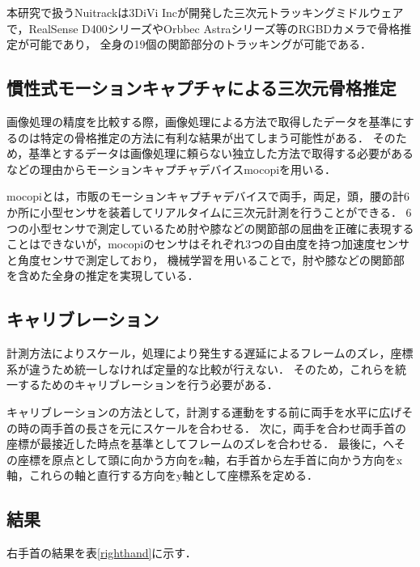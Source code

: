 \documentclass[titlepage]{jarticle}
\begin{document}
本研究で扱うNuitrackは3DiVi Incが開発した三次元トラッキングミドルウェアで，RealSense D400シリーズやOrbbec Astraシリーズ等のRGBDカメラで骨格推定が可能であり，
全身の19個の関節部分のトラッキングが可能である．
%
%
\subsection{慣性式モーションキャプチャによる三次元骨格推定}
%
画像処理の精度を比較する際，画像処理による方法で取得したデータを基準にするのは特定の骨格推定の方法に有利な結果が出てしまう可能性がある．
そのため，基準とするデータは画像処理に頼らない独立した方法で取得する必要があるなどの理由からモーションキャプチャデバイスmocopi\cite{mocopi}を用いる．

mocopiとは，市販のモーションキャプチャデバイスで両手，両足，頭，腰の計6か所に小型センサを装着してリアルタイムに三次元計測を行うことができる．
6つの小型センサで測定しているため肘や膝などの関節部の屈曲を正確に表現することはできないが，mocopiのセンサはそれぞれ3つの自由度を持つ加速度センサと角度センサで測定しており，
機械学習を用いることで，肘や膝などの関節部を含めた全身の推定を実現している．
%
%
\subsection{キャリブレーション}
%
計測方法によりスケール，処理により発生する遅延によるフレームのズレ，座標系が違うため統一しなければ定量的な比較が行えない．
そのため，これらを統一するためのキャリブレーションを行う必要がある．

キャリブレーションの方法として，計測する運動をする前に両手を水平に広げその時の両手首の長さを元にスケールを合わせる．
次に，両手を合わせ両手首の座標が最接近した時点を基準としてフレームのズレを合わせる．
最後に，へその座標を原点として頭に向かう方向をz軸，右手首から左手首に向かう方向をx軸，これらの軸と直行する方向をy軸として座標系を定める．
%
%
\subsection{結果}
%
右手首の結果を表\ref{righthand}に示す．
\end{document}
